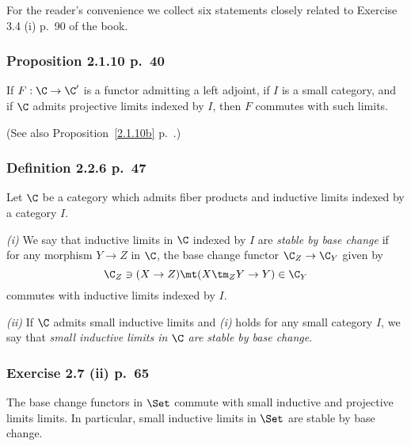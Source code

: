 \documentclass[12pt]{article}
\theoremstyle{remark}
\theoremstyle{definition}
\begin{document}


For the reader's convenience we collect six statements closely related to Exercise 3.4 (i) p.~90 of the book. 

\subsubsection{Proposition 2.1.10 p.~40}

\begin{prop}[Proposition 2.1.10 p.~40]
If $F:\C\to\C'$ is a functor admitting a left adjoint, if $I$ is a small category, and if $\C$ admits projective limits indexed by $I$, then $F$ commutes with such limits.
\end{prop}

(See also Proposition~\ref{2.1.10b} p.~.)

\subsubsection{Definition 2.2.6 p.~47}

\begin{df}
Let $\C$ be a category which admits fiber products and inductive limits indexed by a category $I$.

\nn\emph{(i)} We say that inductive limits in $\C$ indexed by $I$ are \emph{stable by base change} if for any morphism $Y\to Z$ in $\C$, the base change functor $\C_Z\to\C_Y$ given by 
$$
\C_Z\ni(X\to Z)\mt(X\tm_ZY\to Y)\in\C_Y
$$ 
commutes with inductive limits indexed by $I$.

\nn\emph{(ii)} If $\C$ admits small inductive limits and \emph{(i)} holds for any small category $I$, we say that \emph{small inductive limits in $\C$ are stable by base change}.
\end{df}

\subsubsection{Exercise 2.7 (ii) p.~65}

\begin{prop}[Exercise 2.7 (ii) p.~65]
The base change functors in $\Set$ commute with small inductive and projective limits limits. In particular, small inductive limits in $\Set$ are stable by base change.
\end{prop}
\end{document}
